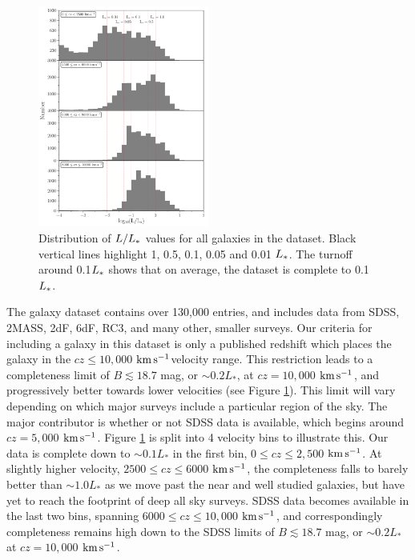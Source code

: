 \documentclass[iop]{emulateapj-rtx4}
\newcommand{\kms}{$\rm km\, s^{-1}$}
\begin{document}
\begin{figure}[ht!]
        \centering
        \vspace{0pt}
        \includegraphics[width=0.50\textwidth]{fig1.pdf}
        \caption{\small{Distribution of $L/L_{\**}$ values for all galaxies in the dataset. Black vertical lines highlight 1, 0.5, 0.1, 0.05 and 0.01 $L_{\**}$. The turnoff around 0.1$L_{\**}$ shows that on average, the dataset is complete to 0.1$L_{\**}$.}}
        \label{completeness}
\end{figure} 

The galaxy dataset contains over 130,000 entries, and includes data from SDSS, 2MASS, 2dF, 6dF, RC3, and many other, smaller surveys. Our criteria for including a galaxy in this dataset is only a published redshift which places the galaxy in the $cz \leq 10,000$ \kms velocity range. This restriction leads to a completeness limit of $B \lesssim 18.7$ mag, or $\sim0.2 L_*$, at $cz = 10,000$ \kms, and progressively better towards lower velocities (see Figure \ref{completeness}). This limit will vary depending on which major surveys include a particular region of the sky. The major contributor is whether or not SDSS data is available, which begins around $cz = 5,000$ \kms. Figure \ref{completeness} is split into 4 velocity bins to illustrate this. Our data is complete down to $\sim0.1 L_*$ in the first bin, $0 \leq cz \leq 2,500$ \kms. At slightly higher velocity, $2500 \leq cz \leq 6000$ \kms, the completeness falls to barely better than $\sim1.0 L_*$ as we move past the near and well studied galaxies, but have yet to reach the footprint of deep all sky surveys. SDSS data becomes available in the last two bins, spanning $6000 \leq cz \leq 10,000$ \kms, and correspondingly completeness remains high down to the SDSS limits of $B \lesssim 18.7$ mag, or $\sim0.2 L_*$ at $cz = 10,000$ \kms.
\end{document}
